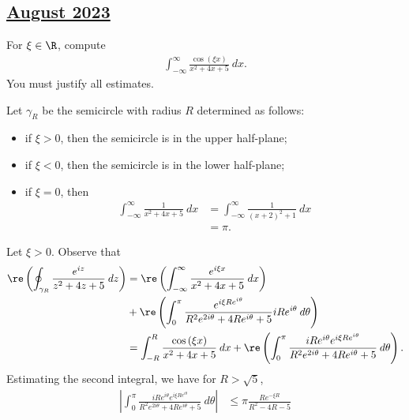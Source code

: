 \documentclass[10pt]{mypackage}
\begin{document}
\subsection{\href{https://math.virginia.edu/graduate/exams/analysis/2023Aug_complex.html}{August 2023}}%
\begin{problem}[Problem 1]
  For $\xi\in \R$, compute
  \begin{align*}
    \int_{-\infty}^{\infty} \frac{\cos\left( \xi x \right)}{x^2 + 4x + 5}\:dx.
  \end{align*}
  You must justify all estimates.
\end{problem}
\begin{solution}
  Let $\gamma_R$ be the semicircle with radius $R$ determined as follows:
  \begin{itemize}
    \item if $\xi > 0$, then the semicircle is in the upper half-plane;
    \item if $\xi < 0$, then the semicircle is in the lower half-plane;
    \item if $\xi = 0$, then
      \begin{align*}
        \int_{-\infty}^{\infty} \frac{1}{x^2 + 4x + 5}\:dx &= \int_{-\infty}^{\infty} \frac{1}{\left( x + 2 \right)^2 + 1}\:dx\\
                                                           &= \pi.
      \end{align*}
  \end{itemize}
  Let $\xi > 0$. Observe that
  \begin{align*}
    \re \left( \oint_{\gamma_R}^{} \frac{e^{iz}}{z^2 + 4z + 5}\:dz \right) &= \re\left( \int_{-\infty}^{\infty} \frac{e^{i \xi x}}{x^2 + 4x + 5}\:dx \right)\\
                                                           &+ \re\left( \int_{0}^{\pi} \frac{e^{i\xi Re^{i\theta}}}{R^2 e^{2i\theta} + 4Re^{i\theta} + 5}iRe^{i\theta}\:d\theta \right)\\
                                                           &= \int_{-R}^{R} \frac{\cos\left( \xi x \right)}{x^2 + 4x + 5}\:dx + \re\left( \int_{0}^{\pi} \frac{iRe^{i\theta}e^{i\xi Re^{i\theta}}}{R^2e^{2i\theta} + 4Re^{i\theta} + 5}\:d\theta \right).
  \end{align*}
  Estimating the second integral, we have for $R > \sqrt{5}$,
  \begin{align*}
    \left\vert \int_{0}^{\pi} \frac{iRe^{i\theta}e^{i\xi Re^{i\theta}}}{R^2e^{2i\theta} + 4Re^{i\theta} + 5}\:d\theta \right\vert &\leq \pi \frac{Re^{-\xi R}}{R^2-4R-5}\\

\end{align*}
\end{solution}
\end{document}
